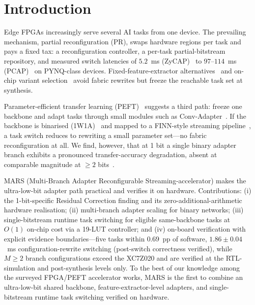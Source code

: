 \documentclass[conference]{IEEEtran}
\begin{document}
\section{Introduction}
Edge FPGAs increasingly serve several AI tasks from one device. The prevailing mechanism, partial reconfiguration (PR), swaps hardware regions per task and pays a fixed tax: a reconfiguration controller, a per-task partial-bitstream repository, and measured switch latencies of $5.2$~ms (ZyCAP)~\cite{Rangsikunpum2024CoarseToFine} to $97$--$114$~ms (PCAP)~\cite{Huang2024ACNNE} on PYNQ-class devices. Fixed-feature-extractor alternatives~\cite{Whatmough2019FixyNN} and on-chip variant selection~\cite{ElBouazzaoui2025NeuroAdaptive} avoid fabric rewrites but freeze the reachable task set at synthesis.

Parameter-efficient transfer learning (PEFT)~\cite{Houlsby2019Adapters,Hu2022LoRA} suggests a third path: freeze one backbone and adapt tasks through small modules such as Conv-Adapter~\cite{Chen2024ConvAdapter}. If the backbone is binarised (1W1A)~\cite{Rastegari2016XNOR,Hubara2016BinarizedNN} and mapped to a FINN-style streaming pipeline~\cite{Umuroglu2017FINN}, a task switch reduces to rewriting a small parameter set---no fabric reconfiguration at all. We find, however, that at 1 bit a single binary adapter branch exhibits a pronounced transfer-accuracy degradation, absent at comparable magnitude at ${\geq}2$ bits~\cite{Jie2023PrecisionRedundancy}.

MARS (Multi-Branch Adapter Reconfigurable Streaming-accelerator) makes the ultra-low-bit adapter path practical and verifies it on hardware. Contributions: (i) the 1-bit-specific Residual Correction finding and its zero-additional-arithmetic hardware realisation; (ii) multi-branch adapter scaling for binary networks; (iii) single-bitstream runtime task switching for eligible same-backbone tasks at $O(1)$ on-chip cost via a 19-LUT controller; and (iv) on-board verification with explicit evidence boundaries---five tasks within $0.69$~pp of software, $1.86\pm0.04$~ms configuration-rewrite switching (post-switch correctness verified), while $M{\geq}2$ branch configurations exceed the XC7Z020 and are verified at the RTL-simulation and post-synthesis levels only. To the best of our knowledge among the surveyed FPGA/PEFT accelerator works, MARS is the first to combine an ultra-low-bit shared backbone, feature-extractor-level adapters, and single-bitstream runtime task switching verified on hardware.
\end{document}
